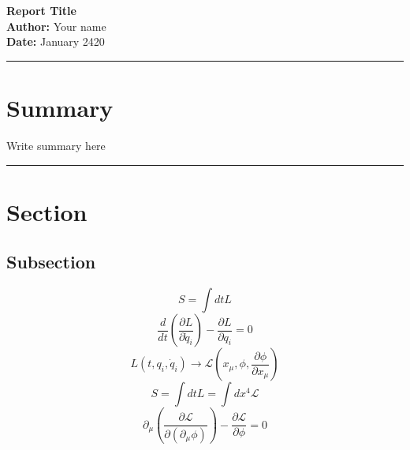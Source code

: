 \documentclass[11pt,a4paper,singlespacing]{article}
\begin{document}
	
\huge 
\noindent \textbf{Report Title} \\ 
\normalsize
\noindent \textbf{Author:} Your name \\
\noindent \textbf{Date:} January 2420 \\
\normalsize
\vspace{0.4cm}
\hrule

\section*{Summary}


Write summary here
 
\vspace{0.4cm}
\hrule


\section{Section}


\lipsum[2]

\subsection{Subsection}

\lipsum[1]


%
\begin{equation}
	S   = \int dt L
\end{equation}
%
\lipsum[3] 
%
\begin{equation}
	\frac{d}{dt} \left( \frac{\partial L}{\partial \dot{q}_i} \right) - \frac{\partial L}{\partial q_i} = 0
\end{equation}
%
\lipsum[3]
\begin{equation}
L(t,q_i , \dot{q}_i) \rightarrow \mathcal{L}\left(x_\mu , \phi , \frac{\partial \phi}{\partial x_\mu} \right)
\end{equation}
%
\lipsum[3]
%
\begin{equation}
	S = \int dt L = \int dx^4 \mathcal{L}	
\end{equation}
%
\lipsum[4]
%
\begin{equation}
\partial_\mu \left( \frac{\partial \mathcal{L}}{\partial (\partial_\mu \phi)}\right) - \frac{\partial \mathcal{L}}{\partial \phi} = 0
\end{equation}
%
\end{document}
